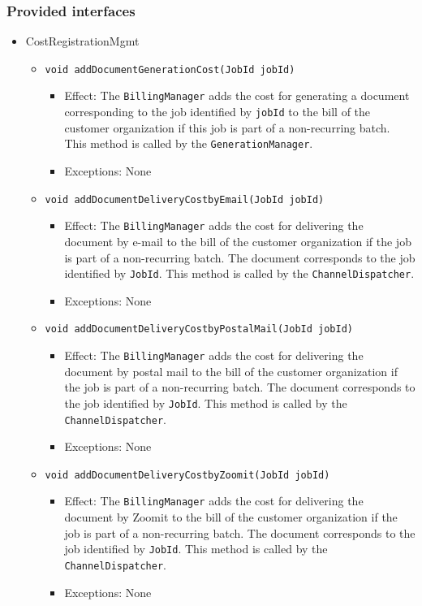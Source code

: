 \documentclass[a4paper,10pt]{article}
\begin{document}
\subsubsection*{Provided interfaces}
\begin{itemize}
    \item CostRegistrationMgmt
    \begin{itemize}
        \item \texttt{void addDocumentGenerationCost(JobId jobId)}
        \begin{itemize}
            \item Effect: The \texttt{BillingManager} adds the cost for generating a document corresponding to the job identified by \texttt{jobId} to the bill of the customer organization if this job is part of a non-recurring batch. This method is called by the \texttt{GenerationManager}.
            \item Exceptions: None
        \end{itemize}
        
		\item \texttt{void addDocumentDeliveryCostbyEmail(JobId jobId)}       
        \begin{itemize}
            \item Effect: The \texttt{BillingManager} adds the cost for delivering the document by e-mail to the bill of the customer organization if the job is part of a non-recurring batch. The document corresponds to the job identified by \texttt{JobId}. This method is called by the \texttt{ChannelDispatcher}.
            \item Exceptions: None
        \end{itemize} 

		\item \texttt{void addDocumentDeliveryCostbyPostalMail(JobId jobId)}       
        \begin{itemize}
            \item Effect: The \texttt{BillingManager} adds the cost for delivering the document by postal mail to the bill of the customer organization if the job is part of a non-recurring batch. The document corresponds to the job identified by \texttt{JobId}. This method is called by the \texttt{ChannelDispatcher}.
            \item Exceptions: None
        \end{itemize} 
        
		\item \texttt{void addDocumentDeliveryCostbyZoomit(JobId jobId)}       
        \begin{itemize}
            \item Effect: The \texttt{BillingManager} adds the cost for delivering the document by Zoomit to the bill of the customer organization if the job is part of a non-recurring batch. The document corresponds to the job identified by \texttt{JobId}. This method is called by the \texttt{ChannelDispatcher}.
            \item Exceptions: None
        \end{itemize}   
        

\end{itemize}
\end{itemize}
\end{document}
